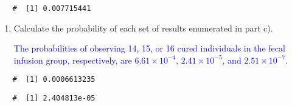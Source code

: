 \documentclass[letterpaper,12pt,twoside,]{pinp}
\begin{document}
\begin{enumerate}
  \begin{ShadedResult}
   \begin{verbatim}
   #  [1] 0.007715441
   \end{verbatim}
   \end{ShadedResult}

  \begin{enumerate}
  \def\labelenumii{\alph{enumii})}
  \setcounter{enumii}{4}
  \item
    Calculate the probability of each set of results enumerated in part
    c).

    \textcolor{blue}{The probabilities of observing 14, 15, or 16 cured individuals in the fecal infusion group, respectively, are $6.61 \times 10^{-4}$, $2.41 \times 10^{-5}$, and $2.51 \times 10^{-7}$. }
  \end{enumerate}

\begin{Shaded}
\begin{Highlighting}[]
\NormalTok{(}\NormalTok{, }\NormalTok{, } \OperatorTok{-}\StringTok{ }\NormalTok{, }\NormalTok{)}
\end{Highlighting}
\end{Shaded}

  \begin{ShadedResult}
   \begin{verbatim}
   #  [1] 0.0006613235
   \end{verbatim}
   \end{ShadedResult}

\begin{Shaded}
\begin{Highlighting}[]
\NormalTok{(}\NormalTok{, }\NormalTok{, } \OperatorTok{-}\StringTok{ }\NormalTok{, }\NormalTok{)}
\end{Highlighting}
\end{Shaded}

  \begin{ShadedResult}
   \begin{verbatim}
   #  [1] 2.404813e-05
   \end{verbatim}
   \end{ShadedResult}

\begin{Shaded}
\begin{Highlighting}[]
\NormalTok{(}\NormalTok{, }\NormalTok{, } \OperatorTok{-}\StringTok{ }\NormalTok{, }\NormalTok{)}
\end{Highlighting}
\end{Shaded}


\end{enumerate}
\end{document}
